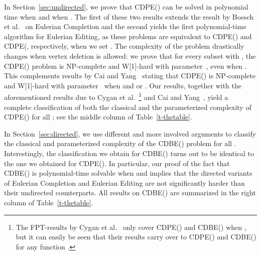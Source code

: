 \documentclass[11pt]{llncs}
\newcommand{\cdpe}{{\sc CDPE}}
\newcommand{\cdbe}{{\sc CDBE}}
\newcommand{\NP}{{\sf NP}}
\newcommand{\FPT}{{\sf FPT}}
\newcommand{\W}{{\sf W[1]}}
\begin{document}
In Section~\ref{sec:undirected}, we prove that \cdpe() can be solved in polynomial time when   
and when .
The first of these two results extends the result by Boesch et
al.~\cite{BoeschST77} on {\sc Eulerian Completion}
 and the second yields the first
polynomial-time algorithm for {\sc Eulerian Editing}, as these problems are
equivalent to \cdpe() and \cdpe(, respectively, when we
set . 
The complexity of the problem drastically changes when vertex deletion is allowed: we prove that for every subset  with , the \cdpe() problem is
\NP-complete and \W-hard with parameter~, even when . 
This complements results by Cai and Yang~\cite{CaiY11} stating that \cdpe()
is \NP-complete and \W-hard with parameter~ when 
and  or . 
Our results, together with the aforementioned results due to Cygan et al.~\cite{CyganMPPS14}\footnote{The \FPT-results
by Cygan et al.~\cite{CyganMPPS14} only cover \cdpe() and
\cdbe() when , but it can easily be seen that their
results carry over to \cdpe() and \cdbe() for any function
.} and Cai and
Yang~\cite{CaiY11}, yield a complete classification of both the classical and the parameterized
complexity of \cdpe() for all ; 
see the middle column of Table~\ref{t-thetable}. 

In Section~\ref{sec:directed}, we use different and more involved arguments to classify the classical and parameterized complexity of the \cdbe() problem for all . 
Interestingly, the classification we obtain for \cdbe() turns out to be identical to the one we obtained for \cdpe().  
In particular, our proof of the fact that \cdbe() is polynomial-time solvable when  and  implies that the directed variants of {\sc Eulerian Completion} and {\sc Eulerian Editing} are not significantly harder than their undirected counterparts.
All results on \cdbe() are summarized in the right column of Table~\ref{t-thetable}. 
\end{document}
